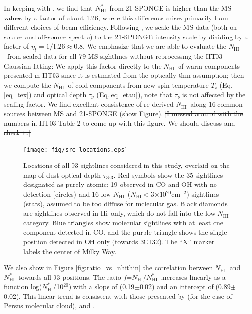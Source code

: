 \documentclass[preprint]{emulateapj}
\def\hi{H{\sc i}}
\def\NHI{$N_\mathrm{HI}$}
\def\NHIthin{$N^{*}_\mathrm{HI}$}
\def\t353{$\tau_{353}$}
\begin{document}
In keeping with \citet{Murray2015}, we find that \NHIthin\ from 21-SPONGE is higher than the MS values by a factor of about 1.26, where this difference arises primarily from different choices of beam efficiency. 
Following \citet{Murray2015}, we scale the MS data (both on-source and off-source spectra) to the 21-SPONGE intensity scale by dividing by a factor of $\eta_{b} = 1/1.26 \approx 0.8$. We emphasize that we are able to evaluate the \NHI\ from scaled data for all 79 MS sightlines without reprocessing the HT03 Gaussian fitting: We apply this factor directly to the \NHI\ of warm components presented in HT03 since it is estimated from the optically-thin assumption; then we compute the \NHI\ of cold components from new spin temperature $T_{s}$ (Eq.\ref{eq_tex}) and optical depth $\tau_{\nu}$ (Eq.\ref{eq_etau}), note that $\tau_{\nu}$ is not affected by the scaling factor. We find excellent consistence of re-derived \NHI\ along 16 common sources between MS and 21-SPONGE (show Figure).
\sout{\color{magenta}[I messed around with the numbers in HT03 Table 2 to come up with this figure. We should discuss and check it.]}

\begin{figure}
 \center
  \texttt{[image: fig/src\_locations.eps]}
  \caption{Locations of all 93 sightlines considered in this study, overlaid on the map of dust optical depth \t353. Red symbols show the 35 sightlines designated as purely atomic; 19 observed in CO and OH with no detection (circles) and 16 low-\NHI\ (\NHI $<$3$\times$10$^{20}$cm$^{-2}$) sightlines (stars), assumed to be too diffuse for molecular gas. Black diamonds are sightlines observed in \hi\ only, which do not fall into the low-\NHI category. Blue triangles show molecular sightlines with at least one component detected in CO, and the purple triangle shows the single position detected in OH only (towards 3C132). The ``X'' marker labels the center of Milky Way.}
  \label{fig:src_locations}
\end{figure}

We also show in Figure \ref{fig:ratio_vs_nhithin} the correlation between \NHI\ and \NHIthin\ towards all 93 positions. The ratio $f$=\NHI/\NHIthin\ increases linearly as a function log(\NHIthin/10$^{20}$) with a slope of (0.19$\pm$0.02) and an intercept of (0.89$\pm$0.02). This linear trend is consistent with those presented by \citet{Lee2015} (for the case of Persus molecular cloud), \citet{Heiles2003a} and \citet{Liszt2014}. 
\end{document}
